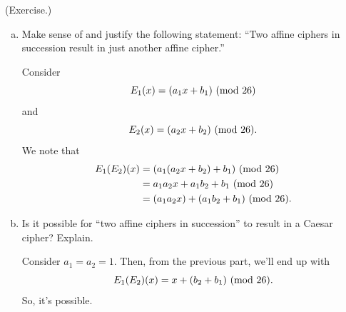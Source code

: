 \documentclass[letterpaper]{article}
\newcommand{\0}{\mathbf{0}}
\begin{document}
\begin{mdframed}
    (Exercise.)
    \begin{enumerate}[(a)]
        \item Make sense of and justify the following statement: ``Two affine ciphers in succession result in just another affine cipher.''
        \begin{mdframed}
            Consider \[E_{1}(x) = (a_1 x + b_1) \ (\mathrm{mod}\ 26)\] and \[E_{2}(x) = (a_2 x + b_2) \ (\mathrm{mod}\ 26).\] We note that 
            \begin{equation*}
                \begin{aligned}
                    E_{1}(E_{2})(x) &= (a_1 (a_2 x + b_2) + b_1) \ (\mathrm{mod}\ 26) \\ 
                        &= a_1 a_2 x + a_1 b_2 + b_1 \ (\mathrm{mod}\ 26) \\ 
                        &= (a_1 a_2 x) + (a_1 b_2 + b_1)  \ (\mathrm{mod}\ 26).
                \end{aligned}
            \end{equation*}
        \end{mdframed}

        \item Is it possible for ``two affine ciphers in succession'' to result in a Caesar cipher? Explain.
        \begin{mdframed}
            Consider $a_1 = a_2 = 1$. Then, from the previous part, we'll end up with 
            \[E_{1}(E_{2})(x) = x + (b_2 + b_1) \ (\mathrm{mod}\ 26).\]
            So, it's possible. 
        \end{mdframed}
    \end{enumerate}
\end{mdframed}
\end{document}
